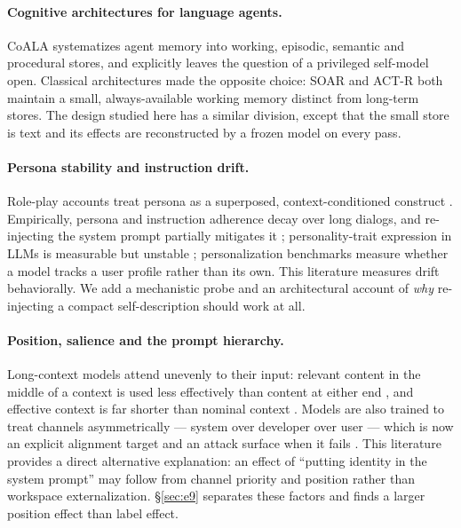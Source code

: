 \documentclass{article}
\begin{document}
\paragraph{Cognitive architectures for language agents.} CoALA \citep{sumers2024coala} systematizes agent memory into working, episodic, semantic and procedural stores, and explicitly leaves the question of a privileged self-model open. Classical architectures made the opposite choice: SOAR \citep{laird2012soar} and ACT-R \citep{anderson2004actr} both maintain a small, always-available working memory distinct from long-term stores. The design studied here has a similar division, except that the small store is text and its effects are reconstructed by a frozen model on every pass.

\paragraph{Persona stability and instruction drift.} Role-play accounts treat persona as a superposed, context-conditioned construct \citep{shanahan2023}. Empirically, persona and instruction adherence decay over long dialogs, and re-injecting the system prompt partially mitigates it \citep{li2024stability}; personality-trait expression in LLMs is measurable but unstable \citep{serapio2023personality,jiang2024personallm}; personalization benchmarks \citep{salemi2024lamp} measure whether a model tracks a user profile rather than its own. This literature measures drift behaviorally. We add a mechanistic probe and an architectural account of \emph{why} re-injecting a compact self-description should work at all.

\paragraph{Position, salience and the prompt hierarchy.} Long-context models attend unevenly to their input: relevant content in the middle of a context is used less effectively than content at either end \citep{liu2024lost}, and effective context is far shorter than nominal context \citep{hsieh2024ruler}. Models are also trained to treat channels asymmetrically --- system over developer over user --- which is now an explicit alignment target \citep{wallace2024hierarchy} and an attack surface when it fails \citep{greshake2023injection}. This literature provides a direct alternative explanation: an effect of ``putting identity in the system prompt'' may follow from channel priority and position rather than workspace externalization. \S\ref{sec:e9} separates these factors and finds a larger position effect than label effect.
\end{document}
